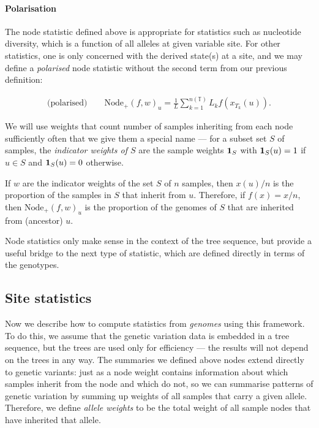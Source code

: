 \documentclass{article}
\newcommand{\nodep}{\mbox{Node}_+} %
\newcommand{\treeseq}{\mathbb{T}} %
\newcommand{\iw}{w} %
\newcommand{\nw}{x} %
\begin{document}
\paragraph{Polarisation}
The node statistic defined above is appropriate for statistics such as nucleotide diversity, which is a function
of all alleles at given variable site.  For other statistics, one is only concerned with the derived state(s)
at a site, and we may define a \emph{polarised} node statistic without the second term from our previous definition:

\begin{align}
    \text{(polarised)} \qquad
    \nodep(f, \iw)_u
    =
    \frac{1}{L} \sum_{k=1}^{n(\treeseq)} L_k f(\nw_{T_k}(u)) .
\end{align}

We will use weights that count number of samples inheriting from each node
sufficiently often that we give them a special name ---
for a subset set $S$ of samples,
the \emph{indicator weights of $S$} are the sample weights $\mathbf{1}_S$ with
$\mathbf{1}_S(u) = 1$ if $u \in S$ and $\mathbf{1}_S(u) = 0$ otherwise.

\begin{example} \label{ex:ancestry_props}
    If $\iw$ are the indicator weights of the set $S$ of $n$ samples,
    then $\nw(u) / n$ is the proportion of the samples in $S$ that inherit from $u$.
    Therefore, if $f(x) = x / n$,
    then $\nodep(f, \iw)_u$ is the proportion of the genomes of $S$
    that are inherited from (ancestor) $u$.
\end{example}

Node statistics only make sense in the context of the tree sequence,
but provide a useful bridge to the next type of statistic,
which are defined directly in terms of the genotypes.


\subsection*{Site statistics}

Now we describe how to compute statistics from \emph{genomes} using this framework.
To do this, we assume that the genetic variation data is embedded in a tree sequence,
but the trees are used only for efficiency --- the results will not depend on
the trees in any way. The summaries we defined above nodes
extend directly to genetic variants: just as a node weight contains information about
which samples inherit from the node and which do not,
so we can summarise patterns of genetic variation by summing up weights of all samples
that carry a given allele.
Therefore, we define \emph{allele weights} to be
the total weight of all sample nodes that have inherited that allele.
\end{document}
